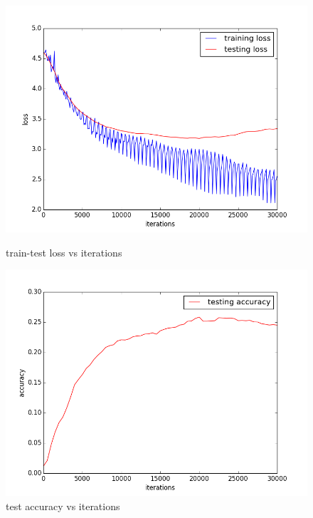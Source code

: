 \documentclass{article} %
\begin{document}
\begin{figure}[H]
    \begin{minipage}{0.5\linewidth}
        \centering
        \includegraphics[scale=0.35]{origin_loss.png}
        \caption{train-test loss vs iterations}
    \end{minipage}
    \begin{minipage}{0.5\linewidth}
        \centering
        \includegraphics[scale=0.35]{origin_test_ac.png}
     \caption{test accuracy vs iterations}
    \end{minipage}
\end{figure}
\end{document}
